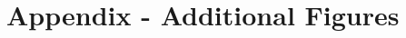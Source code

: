 \documentclass{article}
\begin{document}
%
%
%
%
%

%


\newpage
\section{Appendix - Additional Figures}
\label{sec:Appendix}
\end{document}
